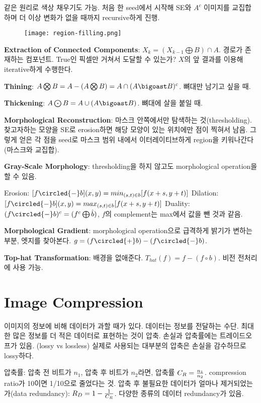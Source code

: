 같은 원리로 색상 채우기도 가능. 처음 한 seed에서 시작해 SE와 $A^c$ 이미지를 교집합하며 더 이상 변화가 없을 때까지 recursive하게 진행.

\begin{figure}[h]
  \centering
  \texttt{[image: region-filling.png]}
\end{figure}

\textbf{Extraction of Connected Components}: $X_k = (X_{k-1} \bigoplus B) \cap A$. 경로가 존재하는 컴포넌트. True인 픽셀만 거쳐서 도달할 수 있는가? $X$의 앞 결과를 이용해 iterative하게 수행한다.

\textbf{Thining}: $A \bigotimes B = A - (A \bigotimes B) = A \cap (A \bigoast B)^c$. 뼈대만 남기고 싶을 때.

\textbf{Thickening}: $A \bigodot B = A \cup (A \bigoast B)$. 뼈대에 살을 붙일 때.

\textbf{Morphological Reconstruction}: 마스크 안쪽에서만 탐색하는 것(thresholding). 찾고자하는 모양을 SE로 erosion하면 해당 모양이 있는 위치에만 점이 찍혀서 남음. 그렇게 얻은 각 점을 seed로 마스크 범위 내에서 이터레이티브하게 region을 키워나간다(마스크와 교집합).

\textbf{Gray-Scale Morphology}: thresholding을 하지 않고도 morphological operation을 할 수 있음.

\bitmz
  \itm Erosion: $[f \circled{-} b](x, y) = min_{(s, t) \in b}[f(x + s, y + t)]$
  \itm Dilation: $[f \circled{-} b](x, y) = max_{(s, t) \in b}[f(x + s, y + t)]$
  \itm Duality: $(f \circled{-} b)^c = (f^c \bigoplus \hat{b})$, $f$의 complement는 max에서 값을 뺀 것과 같음.
\eitmz

\textbf{Morphological Gradient}: morphological operation으로 급격하게 밝기가 변하는 부분, 엣지를 찾아본다. $g = (f \circled{+} b) - (f \circled{-} b)$.

\textbf{Top-hat Transformation}: 배경을 없애준다. $T_{hat}(f) = f - (f \circ b)$. 비전 전처리에 사용 가능.

\section{Image Compression}

이미지의 정보에 비해 데이터가 과할 때가 있다. 데이터는 정보를 전달하는 수단. 최대한 많은 정보를 더 적은 데이터로 표현하는 것이 압축. 손실과 압축률에는 트레이드오프가 있음. (lossy vs lossless) 실제로 사용되는 대부분의 압축은 손실을 감수하므로 lossy하다.

압축률: 압축 전 비트가 $n_1$, 압축 후 비트가 $n_2$라면, 압축률 $C_R = {n_1 \over n_2}$. compression ratio가 10이면 1/10으로 줄었다는 것. 압축 후 불필요한 데이터가 얼마나 제거되었는가(data redundancy): $R_D = 1 - {1 \over C_R}$. 다양한 종류의 데이터 redundancy가 있음.

